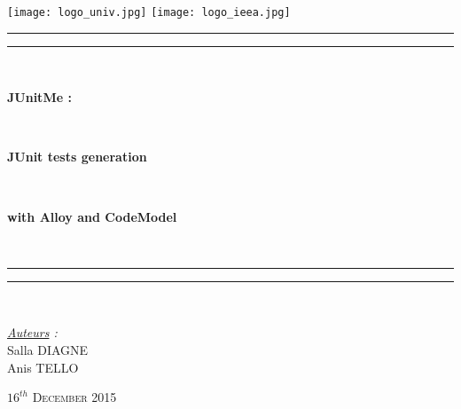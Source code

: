 \thispagestyle{cover}

\texttt{[image: logo\_univ.jpg]}
 \hfill \texttt{[image: logo\_ieea.jpg]} \\

\vspace*{15mm}

\begin{center}

	\vspace*{15mm}

	\rule[0.5ex]{\linewidth}{2pt}\vspace*{-\baselineskip}\vspace*{3.2pt}
	\rule[0.5ex]{\linewidth}{1pt}\\[\baselineskip]

		\begin{Huge} \textbf{JUnitMe :} \end{Huge}\\[4mm]
		\begin{Huge} \textbf{JUnit tests generation} \end{Huge}\\[4mm]
		\begin{Huge} \textbf{with Alloy and CodeModel} \end{Huge}\\[4mm]
	\rule[0.5ex]{\linewidth}{1pt}\vspace*{-\baselineskip}\vspace{3.2pt}
	\rule[0.5ex]{\linewidth}{2pt}\\

	\vspace*{20mm}

	{\LARGE \textit{\underline{Auteurs} :}}\\
	\vspace*{3mm}
	{\LARGE Salla DIAGNE}\\
	\vspace*{3mm}
	{\LARGE Anis TELLO}\\
	
	\vspace*{20mm}
	
	{\LARGE\textsc{$16^{th}$ December 2015}}
\end{center}
